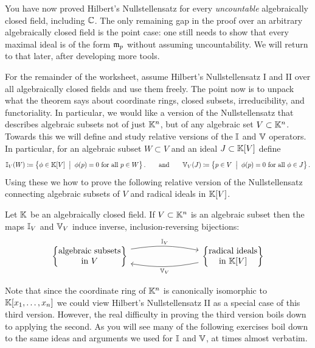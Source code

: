 \documentclass[12pt,reqno]{amsart}
\begin{document}
\hrulefill

You have now proved Hilbert's Nullstellensatz for every \emph{uncountable} algebraically closed field, including $\mathbb{C}$. The only remaining gap in the proof over an arbitrary algebraically closed field is the point case: one still needs to show that every maximal ideal is of the form $\mathfrak{m}_p$ without assuming uncountability. We will return to that later, after developing more tools.

For the remainder of the worksheet, assume Hilbert's Nullstellensatz I and II over all algebraically closed fields and use them freely. The point now is to unpack what the theorem says about coordinate rings, closed subsets, irreducibility, and functoriality. In particular, we would like a version of the Nullstellensatz that describes algebraic subsets not of just $\mathbb{K}^n$, but of any algebraic set $V \subset \mathbb{K}^n$. Towards this we will define and study relative versions of the $\mathbb{I}$ and $\mathbb{V}$ operators. In particular, for an algebraic subset $W \subset V$ and an ideal $J \subset \mathbb{K}[V]$ define
\[
\mathbb{I}_V(W)\coloneqq \left \{\phi \in \mathbb{K}[V] \;\; \big| \;\; \phi(p)=0 \text{ for all }p\in W\right\}.
\quad \quad \text{and} \quad \quad 
\mathbb{V}_V(J)\coloneqq \left\{p\in V \;\; \big| \;\;  \phi(p)=0 \text{ for all }\phi\in J\right\}.
\]
Using these we how to prove the following relative version of the Nullstellensatz connecting algebraic subsets of $V$ and radical ideals in $\mathbb{K}[V]$. 

\begin{theorem} Let $\mathbb{K}$ be an algebraically closed field. If $V \subset \mathbb{K}^n$ is an algebraic subset then the maps $\mathbb{I}_V$ and $\mathbb{V}_V$ induce inverse, inclusion-reversing bijections:
 \[
\begin{tikzcd}[row sep = .5 em, column sep = 8em]
\left\{ \begin{matrix} 
\text{algebraic subsets} \\
\text{in $V$}
\end{matrix} \right\} \arrow[r, bend left=10, "\II_V"] & \arrow[l,bend left=10,"\VV_V"]
\left\{ \begin{matrix} 
\text{radical ideals} \\
\text{in $\KK[V]$}
\end{matrix} \right\} 
\end{tikzcd}
\]
\end{theorem}

Note that since the coordinate ring of $\mathbb{K}^n$ is canonically isomorphic to $\mathbb{K}[x_1,\ldots,x_n]$ we could view Hilbert's Nullstellensatz II as a special case of this third version. However, the real difficulty in proving the third version boils down to applying the second. As you will see many of the following exercises boil down to the same ideas and arguments we used for $\mathbb{I}$ and $\mathbb{V}$, at times almost verbatim. 
\end{document}
